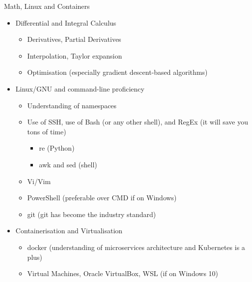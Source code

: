 \documentclass[compress,brown]{beamer}
\begin{document}
\begin{frame}{Math, Linux and Containers}
	\begin{itemize}
		\item Differential and Integral Calculus
		\begin{itemize}
			\item Derivatives, Partial Derivatives
			\item Interpolation, Taylor expansion
			\item Optimisation (especially gradient descent-based algorithms)
		\end{itemize}
	\item Linux/GNU and command-line proficiency
	\begin{itemize}
		\item Understanding of namespaces
		\item Use of SSH, use of Bash (or any other shell), and RegEx (it will save you tons of time)
			\begin{itemize}
				\item re (Python)
				\item awk and sed (shell)
			\end{itemize}
		\item Vi/Vim
		\item PowerShell (preferable over CMD if on Windows)
		\item git (git has become the industry standard)
	\end{itemize}
\item Containerisation and Virtualisation
\begin{itemize}
	\item docker (understanding of microservices architecture and Kubernetes is a plus)
	\item Virtual Machines, Oracle VirtualBox, WSL (if on Windows 10)
\end{itemize}

	\end{itemize}

\end{frame}
\end{document}
